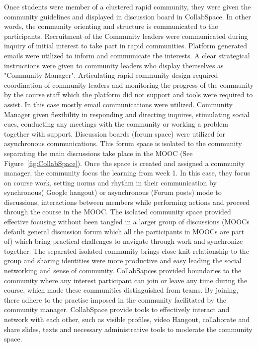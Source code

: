 \documentclass[manuscript,screen,review]{acmart}
\begin{document}
Once students were member of a clustered rapid community, they were given the community guidelines and displayed in discussion board in CollabSpace. In other words, the community orienting and structure is communicated to the participants. Recruitment of the Community leaders were communicated during inquiry of initial interest to take part in rapid communities. Platform generated emails were utilized to inform and communicate the interests. A clear strategical instructions were given to community leaders who display themselves as "Community Manager". Articulating rapid community design required coordination of community leaders and monitoring the progress of the community by the course staff which the platform did not support and tools were required to assist. In this case mostly email communications were utilized. Community Manager given flexibility in responding and directing inquires, stimulating social cues, conducting any meetings with the community or working a problem together with support. Discussion boards (forum space) were utilized for asynchronous communications. This forum space is isolated to the community separating the main discussions take place in the MOOC (See Figure~\ref{fig:CollabSpace}). Once the space is created and assigned a community manager, the community focus the learning from week 1. In this case, they focus on course work, setting norms and rhythm in their communication by synchronous( Google hangout) or asynchronous (Forum posts) mode to discussions, interactions between members while performing actions and proceed through the course in the MOOC. The isolated community space provided effective focusing without been tangled in a larger group of discussions (MOOCs default general discussion forum which all the participants in MOOCs are part of) which bring practical challenges to navigate through work and synchronize together. The separated isolated community brings close knit relationship to the group and sharing identities were more productive and easy leading the social networking and sense of community. CollabSapces provided boundaries to the community where any interest participant can join or leave any time during the course, which made these communities distinguished from teams. By joining, there adhere to the practise imposed in the community facilitated by the community manager. CollabSpace provide tools to effectively interact and network with each other, such as visible profiles, video Hangout, collaborate and share slides, texts and necessary administrative tools to moderate the community space. 
\end{document}
